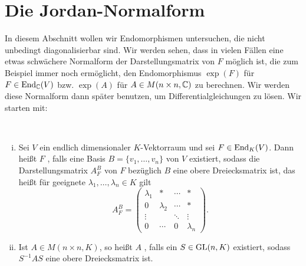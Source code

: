 \section{Die Jordan-Normalform}
\label{sec:2.9}

In diesem Abschnitt wollen wir Endomorphismen untersuchen, die nicht unbedingt diagonalisierbar sind.
Wir werden sehen, dass in vielen Fällen eine etwas schwächere Normalform der Darstellungsmatrix von $F$ möglich ist, die zum Beispiel immer noch ermöglicht, den Endomorphismus $\exp(F)$ für $F \in \operatorname{End}_{\mathbb{C}}(V)$ bzw. $\exp(A)$ für $A \in M(n \times n, \mathbb{C})$ zu berechnen.
Wir werden diese Normalform dann später benutzen, um Differentialgleichungen zu lösen.
Wir starten mit:

\begin{definition}[trigonalisierbar]
	\mbox{} \\[-1.4cm]
	\label{def:9.1}
	\begin{enumerate}[(i)]
		\item Sei $V$ ein endlich dimensionaler $K$-Vektorraum und sei $F \in \operatorname{End}_K(V)$.
		Dann heißt $F$ , falls eine Basis $B = \{v_1,\dots,v_n\}$ von $V$ existiert, sodass die Darstellungsmatrix $A_F^B$ von $F$ bezüglich $B$ eine obere Dreiecksmatrix ist, das heißt für geeignete $\lambda_1,\dots,\lambda_n \in K$ gilt
		\[
			A_F^B = \begin{pmatrix}
			\lambda_1 & * & \cdots & * \\ 
			0 & \lambda_2 & \cdots & * \\ 
			\vdots &  & \ddots & \vdots \\ 
			0 & \cdots & 0 & \lambda_n
			\end{pmatrix}. 
		\]
		\item Ist $A \in M(n \times n, K)$, so heißt $A$ , falls ein $S \in \operatorname{GL}(n,K)$ existiert, sodass $S^{-1}AS$ eine obere Dreiecksmatrix ist.
	\end{enumerate}
\end{definition}

